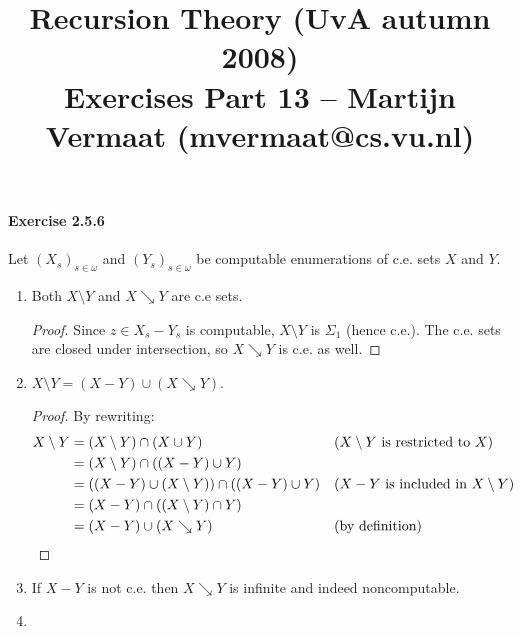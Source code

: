 \documentclass[a4paper,11pt]{article}
\title{Recursion Theory (UvA autumn 2008)\\
\normalsize{Exercises Part 13 -- Martijn Vermaat (mvermaat@cs.vu.nl)}}
\date{}
\begin{document}
\maketitle


\paragraph{Exercise 2.5.6}

Let $(X_s)_{s \in \omega}$ and $(Y_s)_{s \in \omega}$ be computable enumerations of c.e. sets $X$ and $Y$.

\begin{enumerate}[label=(\alph*)]

\item Both $X \setminus Y$ and $X \searrow Y$ are c.e sets.
\begin{proof}
  Since $z \in X_s - Y_s$ is computable, $X \setminus Y$ is $\Sigma_1$ (hence c.e.).
  The c.e. sets are closed under intersection, so $X \searrow Y$ is c.e. as well.
\end{proof}

\item $X \setminus Y = (X - Y) \cup (X \searrow Y)$.
\begin{proof}
  By rewriting:
  \begin{align*}
    X \setminus Y & = (X \setminus Y) \cap (X \cup Y)         && \text{($X \setminus Y$ is restricted to $X$)}\\
    & = (X \setminus Y) \cap ((X - Y) \cup Y)\\
    & = ((X - Y) \cup (X \setminus Y)) \cap ((X - Y) \cup Y)  && \text{($X - Y$ is included in $X \setminus Y$)}\\
    & = (X - Y) \cap ((X \setminus Y) \cap Y)\\
    & = (X - Y) \cup (X \searrow Y)                           && \text{(by definition)}\qedhere
  \end{align*}
\end{proof}

\item If $X - Y$ is not c.e. then $X \searrow Y$ is infinite and indeed noncomputable.

\item

\end{enumerate}
\end{document}
